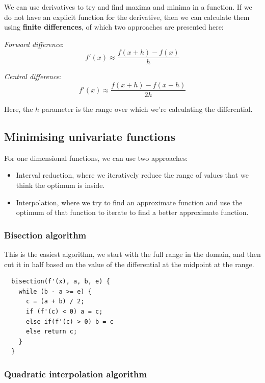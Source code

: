 We can use derivatives to try and find maxima and minima in a
function. If we do not have an explicit function for the derivative,
then we can calculate them using \textbf{finite differences}, of which
two approaches are presented here:

\begin{description}
  \item \textit{Forward difference}:\\
    \[
      f'(x) \approx \frac{f(x + h) - f(x)}{h}
    \]
  \item \textit{Central difference}:\\
    \[
      f'(x) \approx \frac{f(x + h) - f(x - h)}{2h}
    \]
\end{description}

Here, the $h$ parameter is the range over which we're calculating the
differential.

\subsection{Minimising univariate functions}

For one dimensional functions, we can use two approaches:

\begin{itemize}
  \item Interval reduction, where we iteratively reduce the range of values that
  we think the optimum is inside.
  \item Interpolation, where we try to find an approximate function and use the
  optimum of that function to iterate to find a better approximate function.
\end{itemize}

\subsubsection{Bisection algorithm}

This is the easiest algorithm, we start with the full range in the domain, and
then cut it in half based on the value of the differential at the midpoint at
the range.

\begin{verbatim}
  bisection(f'(x), a, b, e) {
    while (b - a >= e) {
      c = (a + b) / 2;
      if (f'(c) < 0) a = c;
      else if(f'(c) > 0) b = c
      else return c;
    }
  }
\end{verbatim}

\subsubsection{Quadratic interpolation algorithm}

